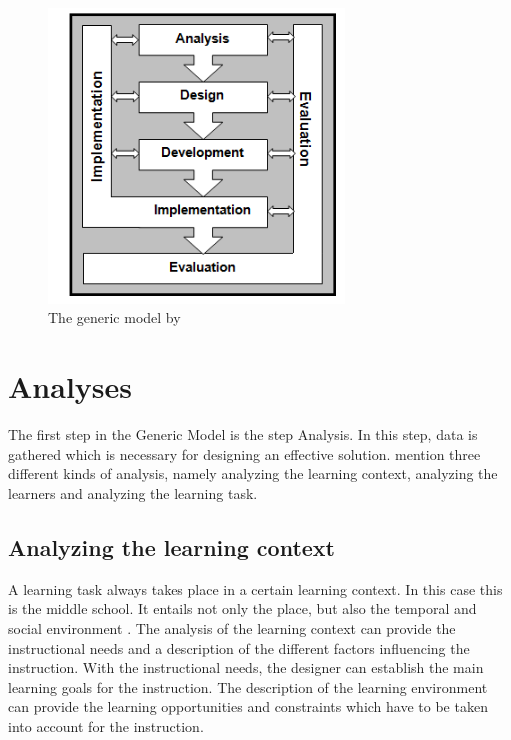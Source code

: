 \documentclass[12pt]{report} %
\begin{document}
\begin{figure}[h]
\centering
\includegraphics[width=0.7\textwidth]{genericmodel}
\caption{\footnotesize The generic model by \protect{}\label{fig:genericmodel}}
\end{figure}

\section{Analyses}

The first step in the Generic Model \cite{genericmodel} is the step Analysis. In this step, data is gathered which is necessary for designing an effective solution.  mention three different kinds of analysis, namely analyzing the learning context, analyzing the learners and analyzing the learning task.

\subsection{Analyzing the learning context}

A learning task always takes place in a certain learning context. In this case this is the middle school. It entails not only the place, but also the temporal and social environment \cite{smithragan}. The analysis of the learning context can provide the instructional needs and a description of the different factors influencing the instruction. With the instructional needs, the designer can establish the main learning goals for the instruction. The description of the learning environment can provide the learning opportunities and constraints which have to be taken into account for the instruction.
\end{document}
